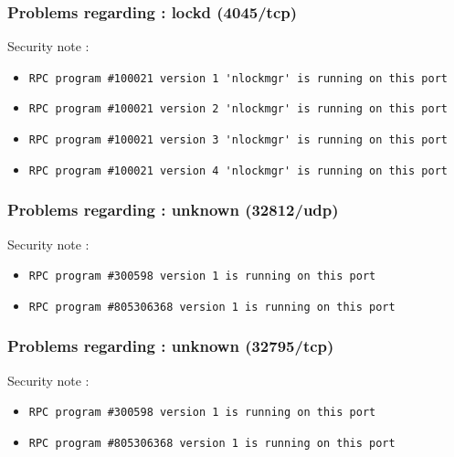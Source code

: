 \documentclass{article}
\begin{document}
\subsubsection{Problems regarding : lockd (4045/tcp)}
Security note :\\
\begin{itemize}
\item \begin{verbatim}
RPC program #100021 version 1 'nlockmgr' is running on this port
\end{verbatim}\item \begin{verbatim}
RPC program #100021 version 2 'nlockmgr' is running on this port
\end{verbatim}\item \begin{verbatim}
RPC program #100021 version 3 'nlockmgr' is running on this port
\end{verbatim}\item \begin{verbatim}
RPC program #100021 version 4 'nlockmgr' is running on this port
\end{verbatim}\end{itemize}
\subsubsection{Problems regarding : unknown (32812/udp)}
Security note :\\
\begin{itemize}
\item \begin{verbatim}
RPC program #300598 version 1 is running on this port
\end{verbatim}\item \begin{verbatim}
RPC program #805306368 version 1 is running on this port
\end{verbatim}\end{itemize}
\subsubsection{Problems regarding : unknown (32795/tcp)}
Security note :\\
\begin{itemize}
\item \begin{verbatim}
RPC program #300598 version 1 is running on this port
\end{verbatim}\item \begin{verbatim}
RPC program #805306368 version 1 is running on this port
\end{verbatim}\end{itemize}
\end{document}
